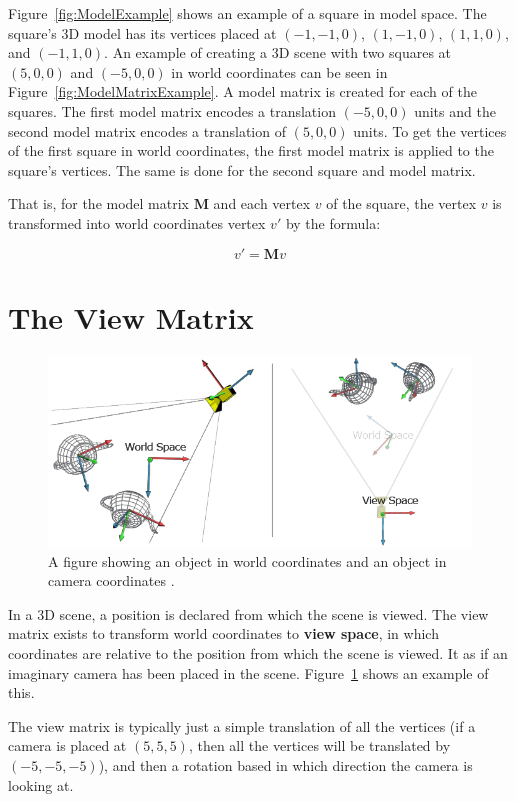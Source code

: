 Figure~\ref{fig:ModelExample} shows an example of a square in model space. The square's 3D model has its vertices placed at $(-1, -1, 0)$, $(1, -1, 0)$, $(1, 1, 0)$, and $(-1, 1, 0)$. An example of creating a 3D scene with two squares at $(5, 0, 0)$ and $(-5, 0, 0)$ in world coordinates can be seen in Figure~\ref{fig:ModelMatrixExample}. A model matrix is created for each of the squares. The first model matrix encodes a translation $(-5, 0, 0)$ units and the second model matrix encodes a translation of $(5, 0, 0)$ units. To get the vertices of the first square in world coordinates, the first model matrix is applied to the square's vertices. The same is done for the second square and model matrix. 

That is, for the model matrix $\mathbf{M}$ and each vertex $v$ of the square, the vertex $v$ is transformed into world coordinates vertex $v'$ by the formula:

\[v' = \mathbf{M}v \]

\section{The View Matrix}
\begin{figure}
	\centering
	\includegraphics[width=\linewidth]{Figures/WorldToView.png}
	\decoRule
	\caption{A figure showing an object in world coordinates and an object in camera coordinates \cite{CodingLabs}.}
	\label{fig:WorldToView}
\end{figure}

In a 3D scene, a position is declared from which the scene is viewed. The view matrix exists to transform world coordinates to \textbf{view space}, in which coordinates are relative to the position from which the scene is viewed. It as if an imaginary camera has been placed in the scene. Figure~\ref{fig:WorldToView} shows an example of this.

The view matrix is typically just a simple translation of all the vertices (if a camera is placed at $(5, 5, 5)$, then all the vertices will be translated by $(-5, -5, -5)$), and then a rotation based in which direction the camera is looking at. 

